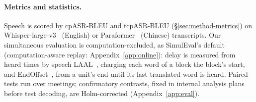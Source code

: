 \paragraph{Metrics and statistics.} Speech is scored by cpASR-BLEU and tcpASR-BLEU (\S\ref{sec:method-metrics}) on
Whisper-large-v3~\citep{radford2023robust} (English) or Paraformer~\citep{gao2022paraformer} (Chinese) transcripts. Our
simultaneous evaluation is computation-excluded, as SimulEval's default (computation-aware replay:
Appendix~\ref{app:online}): delay is measured from heard times by speech LAAL~\citep{papi2022over}, charging each word of a block the
block's start, and EndOffset~\citep{ma2020simuleval}, from a unit's end until its last translated word is heard. Paired
tests run over meetings; confirmatory contrasts, fixed in internal analysis plans before test decoding, are
Holm-corrected (Appendix~\ref{app:eval}).
